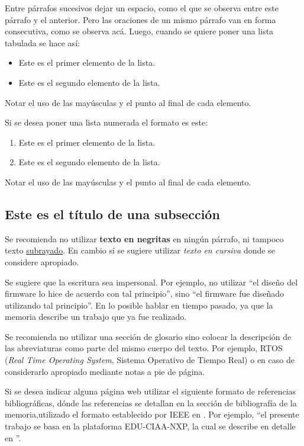 Entre párrafos sucesivos dejar un espacio, como el que se observa entre este párrafo y el anterior. Pero las oraciones de un mismo párrafo van en forma consecutiva, como se observa acá. Luego, cuando se quiere poner una lista tabulada se hace así:

\begin{itemize}
	\item Este es el primer elemento de la lista.
	\item Este es el segundo elemento de la lista.
\end{itemize}

Notar el uso de las mayúsculas y el punto al final de cada elemento.

Si se desea poner una lista numerada el formato es este:

\begin{enumerate}
	\item Este es el primer elemento de la lista.
	\item Este es el segundo elemento de la lista.
\end{enumerate}

Notar el uso de las mayúsculas y el punto al final de cada elemento.

\subsection{Este es el título de una subsección}
\label{subsec:ejemplo}

Se recomienda no utilizar \textbf{texto en negritas} en ningún párrafo, ni tampoco texto \underline{subrayado}. En cambio sí se sugiere utilizar \textit{texto en cursiva} donde se considere apropiado.

Se sugiere que la escritura sea impersonal. Por ejemplo, no utilizar ``el diseño del firmware lo hice de acuerdo con tal principio'', sino ``el firmware fue diseñado utilizando tal principio''. En lo posible hablar en tiempo pasado, ya que la memoria describe un trabajo que ya fue realizado.

Se recomienda no utilizar una sección de glosario sino colocar la descripción de las abreviaturas como parte del mismo cuerpo del texto. Por ejemplo, RTOS (\textit{Real Time Operating System}, Sistema Operativo de Tiempo Real) o en caso de considerarlo apropiado mediante notas a pie de página.

Si se desea indicar alguna página web utilizar el siguiente formato de referencias bibliográficas, dónde las referencias se detallan en la sección de bibliografía de la memoria,utilizado el formato establecido por IEEE en \citep{IEEE:citation}. Por ejemplo, ``el presente trabajo se basa en la plataforma EDU-CIAA-NXP, la cual se describe en detalle en \citep{CIAA}''.

